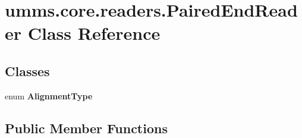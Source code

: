 \hypertarget{classumms_1_1core_1_1readers_1_1_paired_end_reader}{\section{umms.\+core.\+readers.\+Paired\+End\+Reader Class Reference}
\label{classumms_1_1core_1_1readers_1_1_paired_end_reader}
}
\subsection*{Classes}
\begin{DoxyCompactItemize}
\item 
enum {\bfseries Alignment\+Type}
\end{DoxyCompactItemize}
\subsection*{Public Member Functions}
